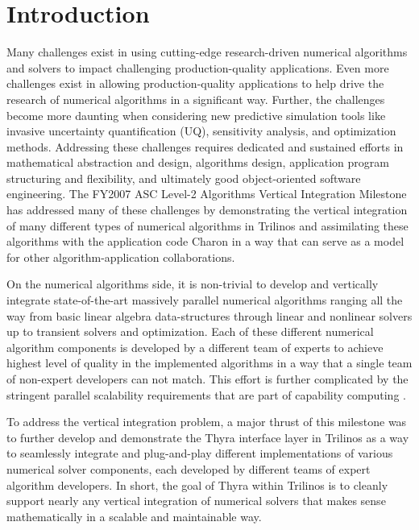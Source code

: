 \documentclass[pdf,ps2pdf,11pt]{SANDreport}
\begin{document}
%

\SANDmain %

%
\section{Introduction}
%

Many challenges exist in using cutting-edge research-driven numerical
algorithms and solvers to impact challenging production-quality applications.
Even more challenges exist in allowing production-quality applications to help
drive the research of numerical algorithms in a significant way.  Further, the
challenges become more daunting when considering new predictive simulation
tools like invasive uncertainty quantification (UQ), sensitivity analysis, and
optimization methods.  Addressing these challenges requires dedicated and
sustained efforts in mathematical abstraction and design, algorithms design,
application program structuring and flexibility, and ultimately good
object-oriented software engineering.  The FY2007 ASC Level-2 Algorithms
Vertical Integration Milestone has addressed many of these challenges by
demonstrating the vertical integration of many different types of numerical
algorithms in Trilinos {}\cite{ref:trilinos} and assimilating these algorithms with the
application code Charon {}\cite{ref:charon} in a way that can serve as a model for other
algorithm-application collaborations.

On the numerical algorithms side, it is non-trivial to develop and vertically
integrate state-of-the-art massively parallel numerical algorithms ranging all
the way from basic linear algebra data-structures through linear and nonlinear
solvers up to transient solvers and optimization.  Each of these different
numerical algorithm components is developed by a different team of experts to
achieve highest level of quality in the implemented algorithms in a way that a
single team of non-expert developers can not match.  This effort is further
complicated by the stringent parallel scalability requirements that are part
of capability computing {}\cite{book:SC}.

To address the vertical integration problem, a major thrust of this milestone
was to further develop and demonstrate the Thyra interface layer in Trilinos
as a way to seamlessly integrate and plug-and-play different implementations of
various numerical solver components, each developed by different teams of
expert algorithm developers.  In short, the goal of Thyra within Trilinos is
to cleanly support nearly any vertical integration of numerical solvers that
makes sense mathematically in a scalable and maintainable way.
\end{document}
